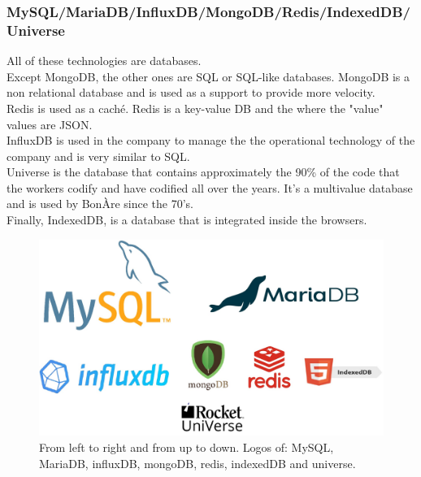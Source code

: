 \documentclass[12pt]{article}
\begin{document}
\subsubsection*{MySQL/MariaDB/InfluxDB/MongoDB/Redis/IndexedDB/Universe}
All of these technologies are databases.\\
Except MongoDB, the other ones are SQL or SQL-like databases. MongoDB is a non relational database and is used as a support to provide more velocity.\\
Redis is used as a caché. Redis is a key-value DB and the where the "value" values are JSON.\\
InfluxDB is used in the company to manage the the operational technology of the company and is very similar to SQL.\\
Universe is the database that contains approximately the 90\% of the code that the workers codify and have codified all over the years. It's a multivalue database and is used by BonÀre since the 70's.\\
Finally, IndexedDB, is a database that is integrated inside the browsers.
\begin{figure}[H]
    \centering
    \includegraphics[scale = 0.3]{Images/logos varis.jpg}
    \caption{From left to right and from up to down. Logos of: MySQL, MariaDB, influxDB, mongoDB, redis, indexedDB and universe.}
    \label{fig:dbs}
\end{figure}
\end{document}
